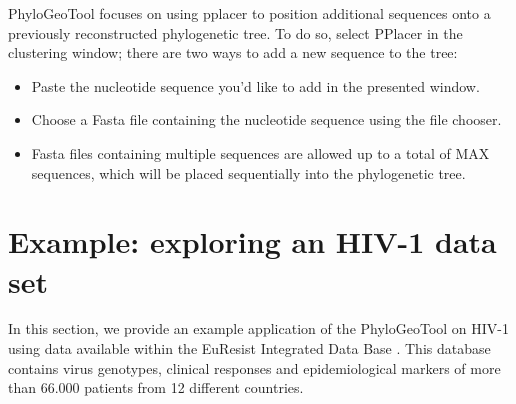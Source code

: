 \documentclass[a4paper, 11pt]{article} %
\begin{document}
PhyloGeoTool focuses on using pplacer to position additional sequences onto a previously reconstructed phylogenetic tree.
To do so, select PPlacer in the clustering window; there are two ways to add a new sequence to the tree:
\begin{itemize}
\item Paste the nucleotide sequence you'd like to add in the presented window.
\item Choose a Fasta file containing the nucleotide sequence using the file chooser.
\item Fasta files containing multiple sequences are allowed up to a total of MAX sequences, which will be placed sequentially into the phylogenetic tree.
\end{itemize}



\section{Example: exploring an HIV-1 data set}

In this section, we provide an example application of the PhyloGeoTool on HIV-1 using data available within the EuResist Integrated Data Base \citep{Zazzi2012}. 
This database contains virus genotypes, clinical responses and epidemiological markers of more than 66.000 patients from 12 different countries.

\end{document}
